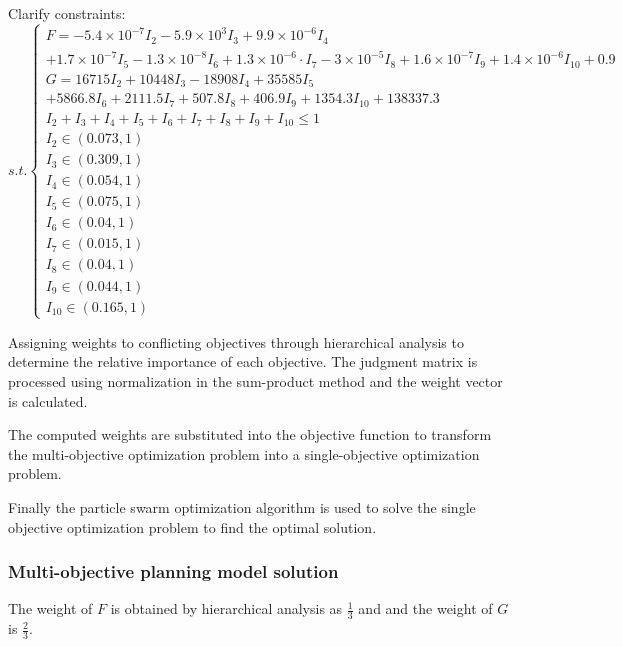 \documentclass[12pt]{article}  %
\begin{document}
	Clarify constraints:
		\begin{equation}
			s.t.\left\{ \begin{array}{l}
				F =  - 5.4 \times {10^{ - 7}}{I_2} - 5.9 \times {10^3}{I_3} + 9.9 \times {10^{ - 6}}{I_4}\\
				+ 1.7 \times {10^{ - 7}}{I_5} - 1.3 \times {10^{ - 8}}{I_6} + 1.3 \times {10^{ - 6}} \cdot {I_7} - 3 \times {10^{ - 5}}{I_8} + 1.6 \times {10^{ - 7}}{I_9} + 1.4 \times {10^{ - 6}}{I_{10}} + 0.9\\
				G = 16715{I_2} + 10448{I_3} - 18908{I_4} + 35585{I_5}\\
				+ 5866.8{I_6} + 2111.5{I_7} + 507.8{I_8} + 406.9{I_9} + 1354.3{I_{10}} + 138337.3\\
				{I_2} + {I_3} + {I_4} + {I_5} + {I_6} + {I_7} + {I_8} + {I_9} + {I_{10}} \le 1\\
				{I_2} \in (0.073,1)\\
				{I_3} \in (0.309,1)\\
				{I_4} \in (0.054,1)\\
				{I_5} \in (0.075,1)\\
				{I_6} \in (0.04,1)\\
				{I_7} \in (0.015,1)\\
				{I_8} \in (0.04,1)\\
				{I_9} \in (0.044,1)\\
				{I_{10}} \in (0.165,1)
			\end{array} \right.
		\end{equation}
	
	Assigning weights to conflicting objectives through hierarchical analysis to determine the relative importance of each objective. The judgment matrix is processed using normalization in the sum-product method and the weight vector is calculated.
	
	The computed weights are substituted into the objective function to transform the multi-objective optimization problem into a single-objective optimization problem.
	
	Finally the particle swarm optimization algorithm is used to solve the single objective optimization problem to find the optimal solution.
	
	\subsubsection{Multi-objective planning model solution}
	
	The weight of $F$ is obtained by hierarchical analysis as $\frac{1}{3}$ and and the weight of $G$ is $\frac{2}{3}$.
	
\end{document}
